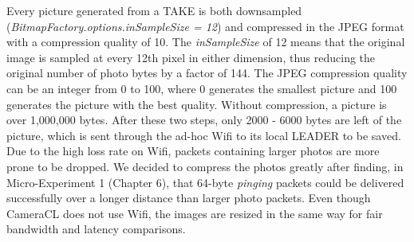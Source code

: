 Every picture generated from a TAKE is both downsampled ({\it BitmapFactory.options.inSampleSize = 12}) and compressed in the JPEG format with a compression quality of 10. The {\it inSampleSize}  of 12 means that the original image is sampled at every 12th pixel in either dimension, thus reducing the original number of photo bytes by a factor of 144. The JPEG compression quality can be an integer from 0 to 100, where 0 generates the smallest picture and 100 generates the picture with the best quality. Without compression, a picture is over 1,000,000 bytes. After these two steps, only 2000 - 6000 bytes are left of the picture, which is sent through the ad-hoc Wifi to its local LEADER to be saved. Due to the high loss rate on Wifi, packets containing larger photos are more prone to be dropped. We decided to compress the photos greatly after finding, in Micro-Experiment 1 (Chapter 6), that 64-byte {\it pinging} packets could be delivered successfully over a longer distance than larger photo packets. Even though CameraCL does not use Wifi, the images are resized in the same way for fair bandwidth and latency comparisons.